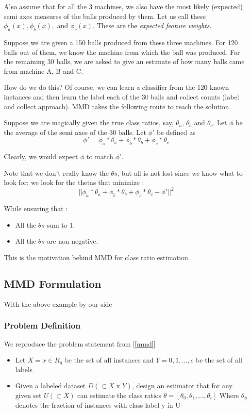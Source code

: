 Also assume that for all the 3 machines, we also have the most likely (expected) semi axes measures of the balls produced by them.
Let us call these $\phi_a(x), \phi_b(x),$ and $\phi_c(x)$. These are the \emph{expected feature weights}.

Suppose we are given a 150 balls produced from these three machines. For 120 balls out of them, we know the machine 
from which the ball was produced. For the remaining 30 balls, we are asked to give an estimate of how many balls came 
from machine A, B and C. 

How do we do this? Of course, we can learn a classifier from the 120 known instances and then learn the label each of 
the 30 balls and collect counts (label and collect approach). MMD takes the following route to reach the solution.

Suppose we are magically given the true class ratios, say, $\theta_a$, $\theta_b$ and $\theta_c$. Let  
$\phi$ be the average of the semi axes of the 30 balls. Let $\phi'$ be defined as 
\begin{equation}
 \phi' = \phi_a * \theta_a + \phi_b * \theta_b + \phi_c * \theta_c 
\end{equation}

Clearly, we would expect $\phi$ to match $\phi'$. 

Note that we don't really know the $\theta s$, but all is not lost since we know what to look for; 
we look for the thetas that minimize : 
\begin{equation}
 ||\phi_a * \theta_a + \phi_b * \theta_b + \phi_c * \theta_c  - \phi'||^2
\end{equation}

While ensuring that  :
\begin{itemize}
 \item All the $\theta s$ sum to 1.
 \item All the $\theta s$ are non negative.
\end{itemize}

This is the motivation behind MMD for class ratio estimation.
\subsection{MMD Formulation}

With the above example by our side
\subsubsection{Problem Definition}
We reproduce the problem statement from [\ref{mmd}]
 \begin{itemize}
  \item  Let $X = {x \in R_d }$ be the set of all instances and 
  $Y = {0, 1, . . . , c}$ be the  set of all labels.
 \medskip
\item Given a labeled dataset $D(\subset X\text{ x } Y)$, design an estimator that for any given set
$U (\subset X )$ can estimate the class ratios $\theta = [\theta_0 , \theta_1 , . . . , \theta_c ]$
Where  $\theta_y$ denotes the fraction of instances with class label y in U 
 \end{itemize}

